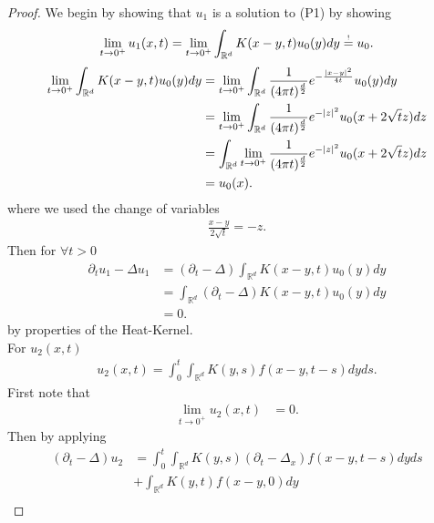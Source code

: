 \begin{proof}
  We begin by showing that $u_{1}$ is a solution to (P1) by showing
  \begin{align*}
    \lim_{t \to 0^{+}}  u_{1}(x,t) = \lim_{t \to 0^{+}} \int_{\mathbb{R}^{d} }K(x-y,t)u_0(y) dy \myS{!}{=} u_{0}
  .\end{align*}
  \begin{align*}
    \lim_{t \to 0^{+} }\int_{\mathbb{R}^{d} }K(x-y,t)u_0(y) dy &= \lim_{t \to 0^{+} } \int_{\mathbb{R}^{d} } \frac{1}{(4\pi t)^{\frac{d}{2}}} e^{-\frac{\abs{x-y}^2}{4t}} u_0(y) dy \\ 
                                           &=  \lim_{t \to 0^{+} } \int_{\mathbb{R}^{d} } \frac{1}{(4\pi t)^{\frac{d}{2}} } e^{-\abs{z}^2}  u_{0}(x+2 \sqrt{t} z ) dz \\
                                           &= \int_{\mathbb{R}^{d}  } \lim_{t \to 0^{+} } \frac{1}{(4\pi t)^{\frac{d}{2}} } e^{-\abs{z}^2}  u_{0}(x+2 \sqrt{t} z ) dz \\
                                           &= u_0(x)  
  .\end{align*}
  where we used the change of variables 
  \begin{align*}
    \frac{x-y}{2 \sqrt{t} }= -z
  .\end{align*}
  Then  for $\forall  t > 0$
  \begin{align*}
    \partial_t u_{1} - \Delta u_{1} &= (\partial_t -  \Delta) \int_{\mathbb{R}^{d} } K(x-y,t)u_0(y)dy\\
                                    &= \int_{\mathbb{R}^{d} } (\partial_t - \Delta )K(x-y,t) u_0(y) dy \\
                                    &= 0
  .\end{align*}
  by properties of the Heat-Kernel. \\[1ex]
  For $u_{2}(x,t)$  
  \begin{align*}
    u_{2}(x,t)  = \int_0^{t}  \int_{\mathbb{R}^{d} }K(y,s)f(x-y,t-s) dy ds
  .\end{align*}
  First note that  
  \begin{align*}
    \lim_{t \to 0^{+}}  u_{2}(x,t) &= 0 
  .\end{align*}
  Then by applying 
  \begin{align*}
    (\partial_t - \Delta )u_{2}  &= \int_0^{t} \int_{\mathbb{R}^{d} } K(y,s)(\partial_t - \Delta_x)f(x-y,t-s) dy ds \\
                                 &+ \int_{\mathbb{R}^{d} } K(y,t)f(x-y,0) dy\\

\end{align*}
\end{proof}
